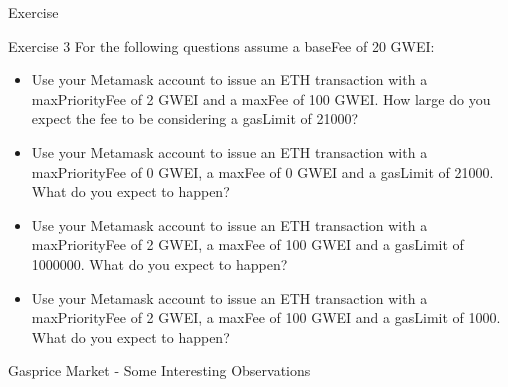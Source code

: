 \documentclass[]{beamer}
\begin{document}
\begin{frame}{Exercise}
	\begin{exercise}{Exercise 3}
	For the following questions assume a baseFee of 20 GWEI:
	\begin{itemize}
		\item Use your Metamask account to issue an ETH transaction with a maxPriorityFee of 2 GWEI and a maxFee of 100 GWEI. How large do you expect the fee to be considering a gasLimit of 21000?
		\item Use your Metamask account to issue an ETH transaction with a maxPriorityFee of 0 GWEI, a maxFee of 0 GWEI and a gasLimit of 21000. What do you expect to happen?
		\item Use your Metamask account to issue an ETH transaction with a maxPriorityFee of 2 GWEI, a maxFee of 100 GWEI and a gasLimit of 1000000. What do you expect to happen?
		\item Use your Metamask account to issue an ETH transaction with a maxPriorityFee of 2 GWEI, a maxFee of 100 GWEI and a gasLimit of 1000. What do you expect to happen?
	\end{itemize}
	\end{exercise}
\end{frame}

\begin{frame}{Gasprice Market - Some Interesting Observations}
	\begin{center}
	\begin{tikzpicture}
		
	\end{tikzpicture}
	\end{center}
\end{frame}
\end{document}
